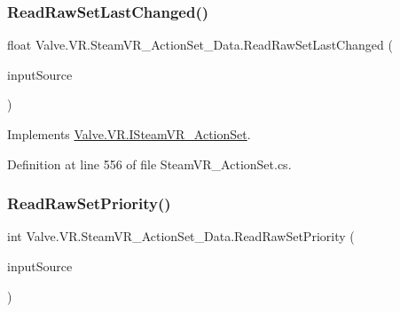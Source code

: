 \mbox{\label{class_valve_1_1_v_r_1_1_steam_v_r___action_set___data_a86331a88d9eddc152fccc295a6c090d6}} 
\subsubsection{\texorpdfstring{ReadRawSetLastChanged()}{ReadRawSetLastChanged()}}
{\footnotesize\ttfamily float Valve.\+V\+R.\+Steam\+V\+R\+\_\+\+Action\+Set\+\_\+\+Data.\+Read\+Raw\+Set\+Last\+Changed (\begin{DoxyParamCaption}\item[{\mbox{\hyperlink{namespace_valve_1_1_v_r_a82e5bf501cc3aa155444ee3f0662853f}{Steam\+V\+R\+\_\+\+Input\+\_\+\+Sources}}}]{input\+Source }\end{DoxyParamCaption})}



Implements \mbox{\hyperlink{interface_valve_1_1_v_r_1_1_i_steam_v_r___action_set_a7647555ffdd2708516296e140100a8ae}{Valve.\+V\+R.\+I\+Steam\+V\+R\+\_\+\+Action\+Set}}.



Definition at line 556 of file Steam\+V\+R\+\_\+\+Action\+Set.\+cs.

\mbox{\label{class_valve_1_1_v_r_1_1_steam_v_r___action_set___data_af564cf8c2a12fe9bfab5b801db820f84}} 
\subsubsection{\texorpdfstring{ReadRawSetPriority()}{ReadRawSetPriority()}}
{\footnotesize\ttfamily int Valve.\+V\+R.\+Steam\+V\+R\+\_\+\+Action\+Set\+\_\+\+Data.\+Read\+Raw\+Set\+Priority (\begin{DoxyParamCaption}\item[{\mbox{\hyperlink{namespace_valve_1_1_v_r_a82e5bf501cc3aa155444ee3f0662853f}{Steam\+V\+R\+\_\+\+Input\+\_\+\+Sources}}}]{input\+Source }\end{DoxyParamCaption})}



